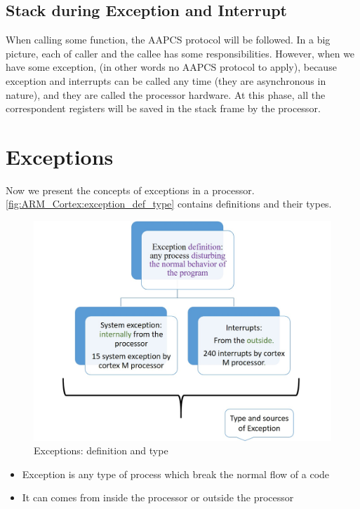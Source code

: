\subsection{Stack during Exception and Interrupt}

When calling some function, the AAPCS protocol will be followed. In a big picture, each of caller and the callee has some responsibilities. However, when we have some exception,  (in other words no AAPCS protocol to apply), because exception and interrupts can be called any time (they are asynchronous in nature), and they are called the processor hardware. At this phase, all the correspondent registers will be saved in the stack frame by the processor.

\newpage

\section{Exceptions}
\label{Sec:Exceptions}

Now we present the concepts of exceptions in a processor. \autoref{fig:ARM_Cortex:exception_def_type} contains definitions and their types.


\begin{figure}[h]
\centering
\includegraphics[scale=0.7]{Figures/ARM_Cortex/exception_def_type}
\caption{Exceptions: definition and type}
\label{fig:ARM_Cortex:exception_def_type}
\end{figure}

\begin{itemize}

\item Exception is any type of process which break the normal flow of a code

\item It can comes from inside the processor or outside the processor

\end{itemize}

